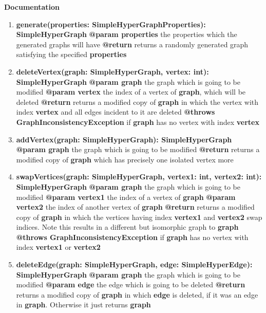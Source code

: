 \documentclass{article}
\begin{document}
	\textbf{Documentation}
	\begin{enumerate}[+]
		\item{
			\textbf{generate(properties: SimpleHyperGraphProperties): SimpleHyperGraph} \newline
			\textbf{@param properties} the properties which the generated graphs will have \newline
			\textbf{@return} returns a randomly generated graph satisfying the specified \textbf{properties}
		}
		\item{
			\textbf{deleteVertex(graph: SimpleHyperGraph, vertex: int): SimpleHyperGraph} \newline
			\textbf{@param graph} the graph which is going to be modified \newline
			\textbf{@param vertex} the index of a vertex of \textbf{graph}, which will be deleted \newline
			\textbf{@return} returns a modified copy of \textbf{graph} in which the vertex with index \textbf{vertex} and all edges incident to it are deleted \newline
			\textbf{@throws GraphInconsistencyException} if \textbf{graph} has no vertex with index \textbf{vertex} 
		}
		\item{
			\textbf{addVertex(graph: SimpleHyperGraph): SimpleHyperGraph} \newline
			\textbf{@param graph} the graph which is going to be modified \newline
			\textbf{@return} returns a modified copy of \textbf{graph} which has precisely one isolated vertex more
		}
		\item{
			\textbf{swapVertices(graph: SimpleHyperGraph, vertex1: int, vertex2: int): SimpleHyperGraph} \newline
			\textbf{@param graph} the graph which is going to be modified \newline
			\textbf{@param vertex1} the index of a vertex of \textbf{graph} \newline
			\textbf{@param vertex2} the index of another vertex of \textbf{graph} \newline
			\textbf{@return} returns a modified copy of \textbf{graph} in which the vertices having index \textbf{vertex1} and \textbf{vertex2} swap indices. Note this results in a different but isomorphic graph to \textbf{graph}  \newline
			\textbf{@throws GraphInconsistencyException} if \textbf{graph} has no vertex with index \textbf{vertex1} or \textbf{vertex2} 
		}
		\item{
			\textbf{deleteEdge(graph: SimpleHyperGraph, edge: SimpleHyperEdge): SimpleHyperGraph} \newline
			\textbf{@param graph} the graph which is going to be modified \newline
			\textbf{@param edge} the edge which is going to be deleted \newline
			\textbf{@return} returns a modified copy of \textbf{graph} in which \textbf{edge} is deleted, if it was an edge in \textbf{graph}. Otherwise it just returns \textbf{graph}
		}
		

\end{enumerate}
\end{document}
